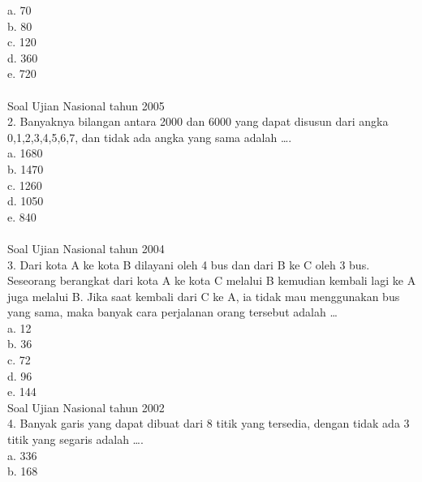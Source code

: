\documentclass[11pt,fleqn]{book} %
\begin{document}
a.	70\\

b.	80\\

c.	120\\

d.	360\\

e.	720\\
\\

Soal Ujian Nasional tahun 2005\\
2. Banyaknya bilangan antara 2000 dan 6000 yang dapat disusun dari angka 0,1,2,3,4,5,6,7, dan tidak ada angka yang sama adalah ….\\

a. 1680\\

b. 1470\\

c. 1260\\

d. 1050\\

e. 840\\
\\

Soal Ujian Nasional tahun 2004\\
3. Dari kota A ke kota B dilayani oleh 4 bus dan dari B ke C oleh 3 bus. Seseorang berangkat dari kota A ke kota C melalui B kemudian kembali lagi ke A juga melalui B. Jika saat kembali dari C ke A, ia tidak mau menggunakan bus yang sama, maka banyak cara perjalanan orang tersebut adalah …\\

a. 12\\

b. 36\\

c. 72\\

d. 96\\

e. 144\\

Soal Ujian Nasional tahun 2002\\
4. Banyak garis yang dapat dibuat dari 8 titik yang tersedia, dengan tidak ada 3 titik yang segaris adalah ….\\

a. 336\\

b. 168\\
\end{document}
